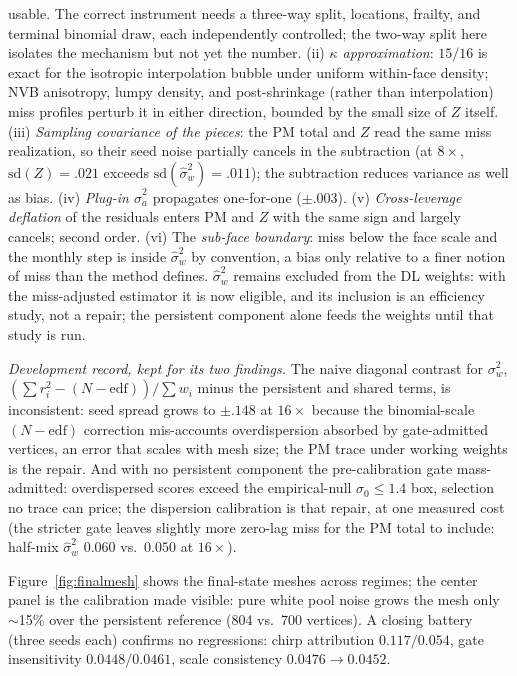 \documentclass[11pt]{article}
\begin{document}
usable. The correct instrument needs a three-way split, locations, frailty,
and terminal binomial draw, each independently controlled; the two-way split
here isolates the mechanism but not yet the number. (ii) \emph{$\kappa$ approximation}: $15/16$ is exact for the
isotropic interpolation bubble under uniform within-face density; NVB
anisotropy, lumpy density, and post-shrinkage (rather than interpolation)
miss profiles perturb it in either direction, bounded by the small size of
$Z$ itself. (iii) \emph{Sampling covariance of the pieces}: the PM total and
$Z$ read the same miss realization, so their seed noise partially cancels in
the subtraction (at $8\times$, $\mathrm{sd}(Z)=.021$ exceeds
$\mathrm{sd}(\hat\sigma_w^2)=.011$); the subtraction reduces variance as
well as bias. (iv) \emph{Plug-in $\hat\sigma_a^2$} propagates one-for-one
($\pm.003$). (v) \emph{Cross-leverage deflation} of the residuals enters PM
and $Z$ with the same sign and largely cancels; second order. (vi) The
\emph{sub-face boundary}: miss below the face scale and the monthly step is
inside $\hat\sigma_w^2$ by convention, a bias only relative to a finer
notion of miss than the method defines. $\hat\sigma_w^2$ remains excluded from the DL weights: with the
miss-adjusted estimator it is now eligible, and its inclusion is an
efficiency study, not a repair; the persistent component alone feeds the
weights until that study is run.

\emph{Development record, kept for its two findings.} The naive diagonal
contrast for $\sigma_w^2$, $(\sum r_i^2-(N-\mathrm{edf}))/\sum w_i$ minus
the persistent and shared terms, is inconsistent: seed spread grows to
$\pm.148$ at $16\times$ because the binomial-scale $(N-\mathrm{edf})$
correction mis-accounts overdispersion absorbed by gate-admitted vertices,
an error that scales with mesh size; the PM trace under working weights is
the repair. And with no persistent component the pre-calibration gate
mass-admitted: overdispersed scores exceed the empirical-null
$\sigma_0\le1.4$ box, selection no trace can price; the dispersion
calibration is that repair, at one measured cost (the stricter gate leaves
slightly more zero-lag miss for the PM total to include: half-mix
$\hat\sigma_w^2$ $0.060$ vs.\ $0.050$ at $16\times$).

Figure~\ref{fig:finalmesh} shows the final-state meshes across regimes; the
center panel is the calibration made visible: pure white pool noise grows
the mesh only $\sim$15\% over the persistent reference (804 vs.\ 700
vertices). A closing battery (three seeds each) confirms no regressions:
chirp attribution $0.117/0.054$, gate insensitivity $0.0448/0.0461$, scale
consistency $0.0476\to0.0452$.
\end{document}
